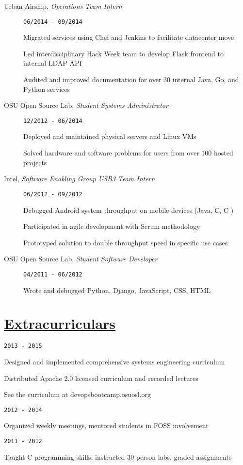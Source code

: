 \documentclass[11pt]{article}
\newcommand{\heading}[1]{
    \section*{\uline{\hfill #1}}
}
\newcommand{\squish}{
    \setlength{\itemsep}{0.5pt}
    \setlength{\parskip}{0pt}
    \setlength{\parsep}{0.5pt}
}
\newcommand{\when}[1]{
    \hfill \texttt{#1}
}
\newcommand{\experience}[3]{
\item[{#1}, \emph{#2}]
    \when{#3}
}
\newcommand{\CPP}{
    C\hspace{-.05em}\raisebox{.4ex}{\tiny\bf +}\hspace{-.10em}\raisebox{.4ex}{\tiny\bf +}
}
\begin{document}
\begin{description}
\squish   
\experience{Urban Airship}
           {Operations Team Intern}
           {06/2014 - 09/2014}
    
    Migrated services using Chef and Jenkins to facilitate datacenter move

    Led interdisciplinary Hack Week team to develop Flask frontend to internal LDAP API

    Audited and improved documentation for over 30 internal Java, Go, and Python
    services

\experience{OSU Open Source Lab}
           {Student Systems Administrator}
           {12/2012 - 06/2014}

    Deployed and maintained physical servers and Linux VMs

    Solved hardware and software problems for users from over 100 hosted projects

\experience{Intel}
           {Software Enabling Group USB3 Team Intern}
           {06/2012 - 09/2012}

    Debugged Android system throughput on mobile devices (Java, C, \CPP)

    Participated in agile development with Scrum methodology

    Prototyped solution to double throughput speed in specific use cases

\experience{OSU Open Source Lab}
           {Student Software Developer}
           {04/2011 - 06/2012}

    Wrote and debugged Python, Django, JavaScript, CSS, HTML

\end{description}

\heading{Extracurriculars}%

\begin{description}
\squish
\experience{OSU DevOps Bootcamp}
           {Founder}
           {2013 - 2015}

    Designed and implemented comprehensive systems engineering curriculum

    Distributed Apache 2.0 licensed curriculum and recorded lectures

    See the curriculum at devopsbootcamp.osuosl.org
    
\experience{OSU Linux Users Group}
           {President}
           {2012 - 2014}

    Organized weekly meetings, mentored students in FOSS involvement

\experience{OSU EECS}
           {Peer Leader, Peer Adviser, and Teaching Assistant}
           {2011 - 2012}

    Taught \CPP  programming skills, instructed 30-person labs, graded assignments

\end{description}
\end{document}
